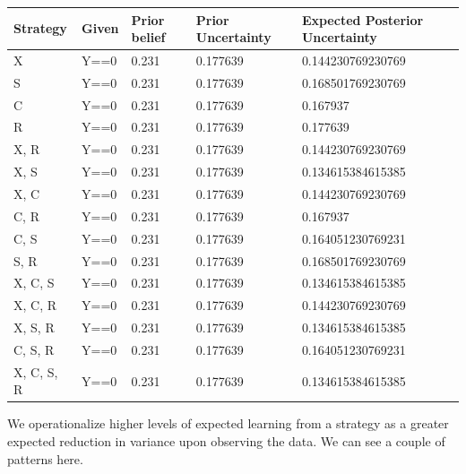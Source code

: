 \documentclass[12pt,]{book}
\begin{document}
\begin{tabular}{l|l|l|l|l}
\hline
Strategy & Given & Prior belief & Prior Uncertainty & Expected Posterior Uncertainty\\
\hline
X & Y==0 & 0.231 & 0.177639 & 0.144230769230769\\
\hline
S & Y==0 & 0.231 & 0.177639 & 0.168501769230769\\
\hline
C & Y==0 & 0.231 & 0.177639 & 0.167937\\
\hline
R & Y==0 & 0.231 & 0.177639 & 0.177639\\
\hline
X, R & Y==0 & 0.231 & 0.177639 & 0.144230769230769\\
\hline
X, S & Y==0 & 0.231 & 0.177639 & 0.134615384615385\\
\hline
X, C & Y==0 & 0.231 & 0.177639 & 0.144230769230769\\
\hline
C, R & Y==0 & 0.231 & 0.177639 & 0.167937\\
\hline
C, S & Y==0 & 0.231 & 0.177639 & 0.164051230769231\\
\hline
S, R & Y==0 & 0.231 & 0.177639 & 0.168501769230769\\
\hline
X, C, S & Y==0 & 0.231 & 0.177639 & 0.134615384615385\\
\hline
X, C, R & Y==0 & 0.231 & 0.177639 & 0.144230769230769\\
\hline
X, S, R & Y==0 & 0.231 & 0.177639 & 0.134615384615385\\
\hline
C, S, R & Y==0 & 0.231 & 0.177639 & 0.164051230769231\\
\hline
X, C, S, R & Y==0 & 0.231 & 0.177639 & 0.134615384615385\\
\hline
\end{tabular}

We operationalize higher levels of expected learning from a strategy as a greater expected reduction in variance upon observing the data. We can see a couple of patterns here.
\end{document}
